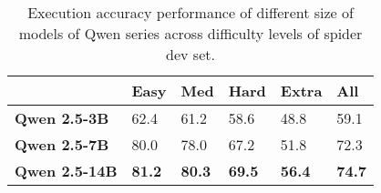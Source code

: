 \begin{table}[t]
\centering
\small
\begin{tabularx}{\linewidth}{lXXXXX}
\toprule
\textbf{}  & \textbf{Easy} & \textbf{Med} & \textbf{Hard} & \textbf{Extra} & \textbf{All} \\ \midrule
\textbf{Qwen 2.5-3B}  & 62.4          &     61.2        &  58.6         & 48.8          & 59.1         \\
\textbf{Qwen 2.5-7B}  & 80.0         & 78.0           & 67.2         &   51.8        & 72.3        \\
\textbf{Qwen 2.5-14B} & \textbf{81.2}          & \textbf{80.3}            & \textbf{69.5}         & \textbf{56.4}          & \textbf{74.7}      \\ 
\bottomrule
\end{tabularx}
\caption{Execution accuracy performance of different size of models of Qwen series across difficulty levels of spider dev set.}
\label{tab:qwen_ab_models}
\end{table}

